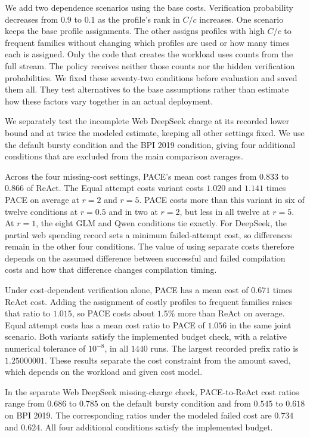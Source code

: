 We add two dependence scenarios using the base costs.
Verification probability decreases from $0.9$ to $0.1$ as the profile's rank in $C/c$ increases.
One scenario keeps the base profile assignments.
The other assigns profiles with high $C/c$ to frequent families without changing which profiles are used or how many times each is assigned.
Only the code that creates the workload uses counts from the full stream.
The policy receives neither those counts nor the hidden verification probabilities.
We fixed these seventy-two conditions before evaluation and saved them all.
They test alternatives to the base assumptions rather than estimate how these factors vary together in an actual deployment.

We separately test the incomplete Web DeepSeek charge at its recorded lower bound and at twice the modeled estimate, keeping all other settings fixed.
We use the default bursty condition and the BPI 2019 condition, giving four additional conditions that are excluded from the main comparison averages.



Across the four missing-cost settings, PACE's mean cost ranges from $0.833$ to $0.866$ of ReAct.
The Equal attempt costs variant costs $1.020$ and $1.141$ times PACE on average at $r=2$ and $r=5$.
PACE costs more than this variant in six of twelve conditions at $r=0.5$ and in two at $r=2$, but less in all twelve at $r=5$.
At $r=1$, the eight GLM and Qwen conditions tie exactly.
For DeepSeek, the partial web spending record sets a minimum failed-attempt cost, so differences remain in the other four conditions.
The value of using separate costs therefore depends on the assumed difference between successful and failed compilation costs and how that difference changes compilation timing.

Under cost-dependent verification alone, PACE has a mean cost of $0.671$ times ReAct cost.
Adding the assignment of costly profiles to frequent families raises that ratio to $1.015$, so PACE costs about $1.5\%$ more than ReAct on average.
Equal attempt costs has a mean cost ratio to PACE of $1.056$ in the same joint scenario.
Both variants satisfy the implemented budget check, with a relative numerical tolerance of $10^{-8}$, in all $1440$ runs.
The largest recorded prefix ratio is $1.25000001$.
These results separate the cost constraint from the amount saved, which depends on the workload and given cost model.

In the separate Web DeepSeek missing-charge check, PACE-to-ReAct cost ratios range from $0.686$ to $0.785$ on the default bursty condition and from $0.545$ to $0.618$ on BPI 2019.
The corresponding ratios under the modeled failed cost are $0.734$ and $0.624$.
All four additional conditions satisfy the implemented budget.

